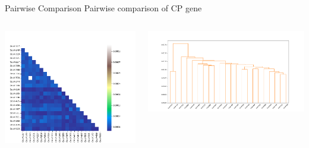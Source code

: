 \documentclass{beamer}
\begin{document}
\begin{frame}{Pairwise Comparison}
    \centering
    Pairwise comparison of CP gene
    \begin{columns}
        \begin{column}{0.35\textwidth}
            \centering
            \includegraphics[scale = 0.25]{PairwiseCPHeatmap.png}
        \end{column}
        \begin{column}{0.65\textwidth}
            \centering
            \includegraphics[scale = 0.25]{PairwiseCPDendrogram.png}
        \end{column}
    \end{columns}
\end{frame}
\end{document}
